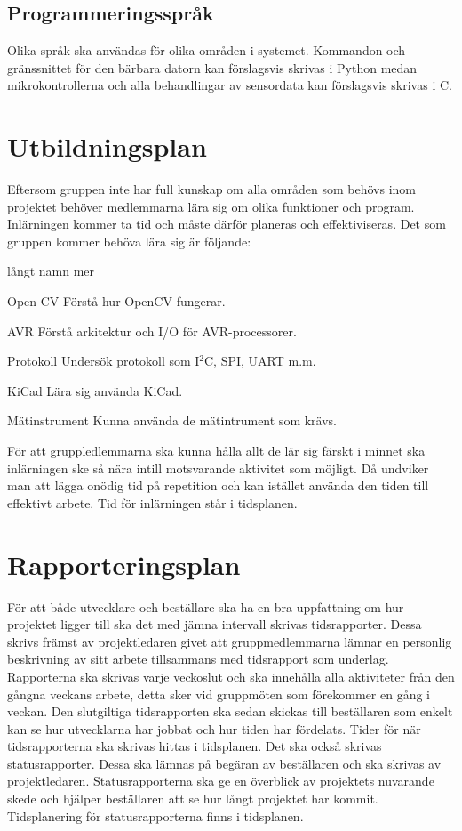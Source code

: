 \documentclass[projektplan/plan.tex]{subfiles}
\begin{document}
\subsection{Programmeringsspråk}
Olika språk ska användas för olika områden i systemet. Kommandon och
gränssnittet för den bärbara datorn kan förslagsvis skrivas i Python medan
mikrokontrollerna och alla behandlingar av sensordata kan förslagsvis skrivas i
C.

\newpage
\section{Utbildningsplan}
\noindent
Eftersom gruppen inte har full kunskap om alla områden som behövs inom
projektet behöver medlemmarna lära sig om olika funktioner och program.
Inlärningen kommer ta tid och måste därför planeras och effektiviseras. Det som
gruppen kommer behöva lära sig är följande:
\begin{labeling}{långt namn mer}
    \item[Open CV] Förstå hur OpenCV fungerar.
    \item[AVR] Förstå arkitektur och I/O för
    AVR-processorer.
    \item[Protokoll] Undersök protokoll som
    I$^2$C, SPI, UART m.m.
    \item[KiCad] Lära sig använda KiCad.
    \item[Mätinstrument] Kunna använda de mätintrument som krävs.
\end{labeling}
För att gruppledlemmarna ska kunna hålla allt de lär sig färskt i minnet ska
inlärningen ske så nära intill motsvarande aktivitet som möjligt. Då undviker
man att lägga onödig tid på repetition och kan istället använda den tiden till
effektivt arbete. Tid för inlärningen står i tidsplanen.

\section{Rapporteringsplan}
För att både utvecklare och beställare ska ha en bra uppfattning om hur
projektet ligger till ska det med jämna intervall skrivas tidsrapporter. Dessa
skrivs främst av projektledaren givet att gruppmedlemmarna lämnar en personlig
beskrivning av sitt arbete tillsammans med tidsrapport som underlag.
Rapporterna ska skrivas varje veckoslut och ska innehålla alla aktiviteter från
den gångna veckans arbete, detta sker vid gruppmöten som förekommer en gång i
veckan. Den slutgiltiga tidsrapporten ska sedan skickas till beställaren som
enkelt kan se hur utvecklarna har jobbat och hur tiden har fördelats. Tider för
när tidsrapporterna ska skrivas hittas i tidsplanen. Det ska också skrivas
statusrapporter. Dessa ska lämnas på begäran av beställaren och ska skrivas av
projektledaren. Statusrapporterna ska ge en överblick av projektets nuvarande
skede och hjälper beställaren att se hur långt projektet har kommit.
Tidsplanering för statusrapporterna finns i tidsplanen.
\end{document}
